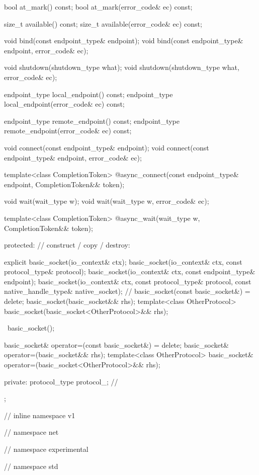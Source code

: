 \begin{codeblock}
{{{{{    bool at_mark() const;
    bool at_mark(error_code& ec) const;

    size_t available() const;
    size_t available(error_code& ec) const;

    void bind(const endpoint_type& endpoint);
    void bind(const endpoint_type& endpoint, error_code& ec);

    void shutdown(shutdown_type what);
    void shutdown(shutdown_type what, error_code& ec);

    endpoint_type local_endpoint() const;
    endpoint_type local_endpoint(error_code& ec) const;

    endpoint_type remote_endpoint() const;
    endpoint_type remote_endpoint(error_code& ec) const;

    void connect(const endpoint_type& endpoint);
    void connect(const endpoint_type& endpoint, error_code& ec);

    template<class CompletionToken>
      @\DEDUCED@ async_connect(const endpoint_type& endpoint,
                            CompletionToken&& token);

    void wait(wait_type w);
    void wait(wait_type w, error_code& ec);

    template<class CompletionToken>
      @\DEDUCED@ async_wait(wait_type w, CompletionToken&& token);

  protected:
    // construct / copy / destroy:

    explicit basic_socket(io_context& ctx);
    basic_socket(io_context& ctx, const protocol_type& protocol);
    basic_socket(io_context& ctx, const endpoint_type& endpoint);
    basic_socket(io_context& ctx, const protocol_type& protocol,
                 const native_handle_type& native_socket); // \nativeref
    basic_socket(const basic_socket&) = delete;
    basic_socket(basic_socket&& rhs);
    template<class OtherProtocol>
      basic_socket(basic_socket<OtherProtocol>&& rhs);

    ~basic_socket();

    basic_socket& operator=(const basic_socket&) = delete;
    basic_socket& operator=(basic_socket&& rhs);
    template<class OtherProtocol>
      basic_socket& operator=(basic_socket<OtherProtocol>&& rhs);

  private:
    protocol_type protocol_; // \expos
  };

} // inline namespace v1
} // namespace net
} // namespace experimental
} // namespace std
\end{codeblock}

